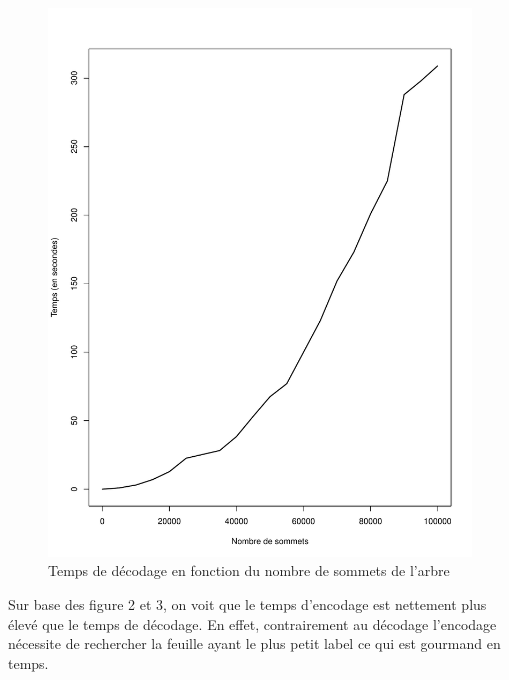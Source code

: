 \documentclass[a4paper, 11pt, oneside]{article}
\begin{document}
\begin{figure}[H]
	\centering
	\includegraphics[scale=0.5]{temps_decodage.pdf} 
	\caption{Temps de décodage en fonction du nombre de sommets de l'arbre}
\end{figure}

Sur base des figure 2 et 3, on voit que le temps d'encodage est nettement plus élevé que le temps de décodage. En effet, contrairement au décodage l'encodage nécessite de rechercher la feuille ayant le plus petit label ce qui est gourmand en temps.
\end{document}
